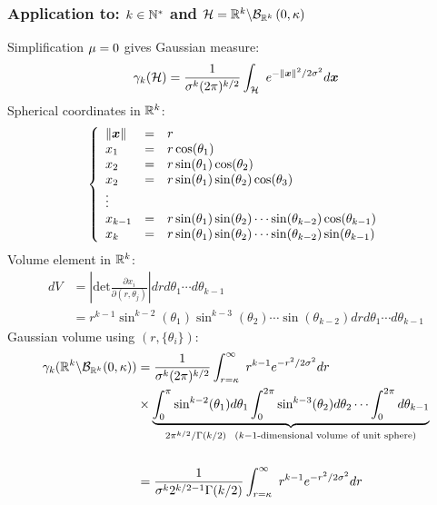 \documentclass[12pt]{article}
\begin{document}
\subsubsection{Application to: $k\in\mathbb{N}^*$ and $\mathcal{H} = \mathbb{R}^k \backslash \mathcal{B}_{\mathbb{R}^k}\left(0,\kappa\right)$}
Simplification $\mu=0$ gives Gaussian measure:
\begin{equation}
    \gamma_k(\mathcal{H}) = \frac{1}{\sigma^k(2\pi)^{k/2}} \int_{\mathcal{H}} \ e^{-\|\boldsymbol{x}\|^2/2\sigma^2} d\boldsymbol{x}
\end{equation}
Spherical coordinates in $\mathbb{R}^k$:
\begin{equation}
  \left\{
  \begin{array}{lcl}
    \|\boldsymbol{x}\|    & = & r \\
    x_1     & = & r \cos(\theta_1) \\
    x_2     & = & r \sin(\theta_1) \cos(\theta_2) \\
    x_2     & = & r \sin(\theta_1) \sin(\theta_2) \cos(\theta_3) \\
    \vdots    & & \\
    x_{k-1} & = & r \sin(\theta_1) \sin(\theta_2) \cdots \sin(\theta_{k-2}) \cos(\theta_{k-1}) \\
    x_k     & = & r \sin(\theta_1) \sin(\theta_2) \cdots \sin(\theta_{k-2}) \sin(\theta_{k-1})
  \end{array}
  \right.
\end{equation}
Volume element in $\mathbb{R}^k$:
\begin{subequations}
  \begin{align*}
    dV & = \left| \text{det}\frac{\partial x_i}{\partial (r,\theta_j)} \right| dr d\theta_1\cdots d\theta_{k-1} \\
       & = r^{k-1}\sin^{k-2}(\theta_1) \sin^{k-3}(\theta_2) \cdots \sin(\theta_{k-2}) dr d\theta_1\cdots d\theta_{k-1}
  \end{align*}
\end{subequations}
Gaussian volume using $(r,\{\theta_i\})$:
\begin{equation}
  \begin{aligned}
    \gamma_k(\Rk \backslash \mathcal{B}_{\Rk}(0,\lset)) & = \frac{1}{\std^k(2\pi)^{k/2}} \int_{r=\lset}^\infty \ r^{k-1} e^{-r^2/2\std^2} dr \\
                                       & \times \underbrace{\int_0^\pi \sin^{k-2}(\theta_1)d\theta_1\int_0^{2\pi}\sin^{k-3}(\theta_2)d\theta_2 \cdots \int_0^{2\pi}d\theta_{k-1}}_{2\pi^{k/2}/\Gamma(k/2) \ \ (k-1\text{-dimensional volume of unit sphere})} \\ \\
                                       & = \frac{1}{\std^k2^{k/2-1}\Gamma(k/2)} \int_{r=\lset}^\infty \ r^{k-1} e^{-r^2/2\std^2} dr
  \end{aligned}
\end{equation}
\end{document}
